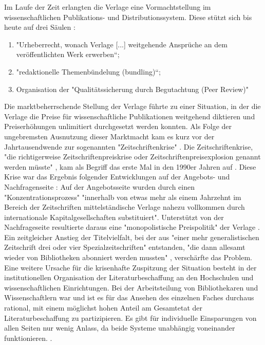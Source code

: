 Im Laufe der Zeit erlangten die Verlage eine Vormachtstellung im wissenschaftlichen Publikations- und Distributionssystem. Diese stützt sich bis heute auf drei Säulen \cite{offhaus_2012_institutionelle_repos} \cite{bargheer_2006_open}:
\begin{enumerate}
\item "Urheberrecht, wonach Verlage [...] weitgehende Ansprüche an dem veröffentlichten Werk erwerben“;
\item "redaktionelle Themenbündelung (bundling)“;
\item Organisation der "Qualitätssicherung durch Begutachtung (Peer Review)"
\end{enumerate}

Die marktbeherrschende Stellung der Verlage führte zu einer Situation, in der die Verlage die Preise für wissenschaftliche Publikationen weitgehend diktieren und Preiserhöhungen unlimitiert durchgesetzt werden konnten. Als Folge der ungebremsten Ausnutzung dieser Marktmacht kam es kurz vor der Jahrtausendwende zur sogenannten "Zeitschriftenkrise"  \cite{Martin_2013} \cite{muller_2010_open} \cite{schirmbacher_2009_wisspub} \cite{Parks_2002_acadamic_faust}. Die Zeitschriftenkrise, "die richtigerweise Zeitschriftenpreiskrise oder Zeitschriftenpreisexplosion genannt werden müsste" \cite {Brintzinger_2010}, kam als Begriff das erste Mal in den 1990er Jahren auf \cite{Boni_2010}. Diese Krise war das Ergebnis folgender Entwicklungen auf der Angebots- und Nachfragenseite \cite{Brintzinger_2010}: Auf der Angebotsseite wurden durch einen "Konzentrationsprozess" "innerhalb von etwas mehr als einem Jahrzehnt im Bereich der Zeitschriften mittelständische Verlage nahezu vollkommen durch internationale Kapitalgesellschaften substituiert". \cite{Brintzinger_2010} Unterstützt von der Nachfrageseite resultierte daraus eine "monopolistische Preispolitik" der Verlage \cite{Brintzinger_2010}. Ein zeitgleicher Anstieg der Titelvielfalt, bei der aus "einer mehr generalistischen Zeitschrift drei oder vier Spezialzeitschriften" entstanden, "die dann allesamt wieder von Bibliotheken abonniert werden mussten" \cite{Brintzinger_2010}, verschärfte das Problem. Eine weitere Ursache für die krisenhafte Zuspitzung der Situation besteht in der institutionellen Organisation der Literaturbeschaffung an den Hochschulen und wissenschaftlichen Einrichtungen. Bei der Arbeitsteilung von Bibliothekaren und Wissenschaftlern war und ist es für das Ansehen des einzelnen Faches durchaus rational, mit einem möglichst hohen Anteil am Gesamtetat der Literaturbeschaffung zu partizipieren. Es gibt für individuelle Einsparungen von allen Seiten nur wenig Anlass, da beide Systeme unabhängig voneinander funktionieren. \cite{Brintzinger_2010}.

